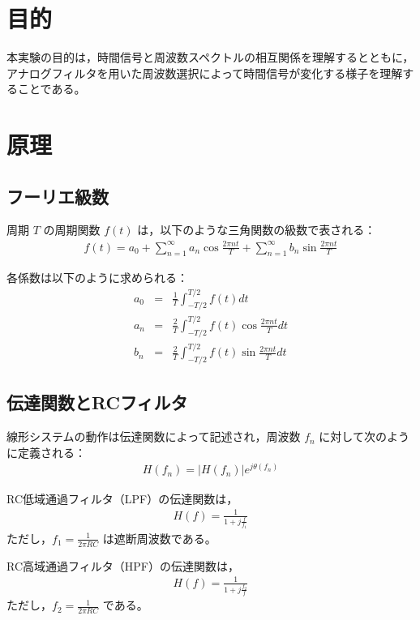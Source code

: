\documentclass[11pt,dvipdfmx]{jarticle}
\begin{document}


\section{目的}
本実験の目的は，時間信号と周波数スペクトルの相互関係を理解するとともに，アナログフィルタを用いた周波数選択によって時間信号が変化する様子を理解することである。

\section{原理}

\subsection{フーリエ級数}
周期 $T$ の周期関数 $f(t)$ は，以下のような三角関数の級数で表される：
\begin{eqnarray}
f(t) = a_0 + \sum_{n=1}^{\infty} a_n \cos \frac{2\pi nt}{T} + \sum_{n=1}^{\infty} b_n \sin \frac{2\pi nt}{T}
\end{eqnarray}

各係数は以下のように求められる：
\begin{eqnarray}
a_0 &=& \frac{1}{T} \int_{-T/2}^{T/2} f(t) dt \\
a_n &=& \frac{2}{T} \int_{-T/2}^{T/2} f(t) \cos \frac{2\pi nt}{T} dt \\
b_n &=& \frac{2}{T} \int_{-T/2}^{T/2} f(t) \sin \frac{2\pi nt}{T} dt
\end{eqnarray}

\subsection{伝達関数とRCフィルタ}
線形システムの動作は伝達関数によって記述され，周波数 $f_n$ に対して次のように定義される：
\begin{eqnarray}
H(f_n) = |H(f_n)| e^{j\theta(f_n)}
\end{eqnarray}

RC低域通過フィルタ（LPF）の伝達関数は，
\begin{eqnarray}
H(f) = \frac{1}{1 + j\frac{f}{f_1}}
\end{eqnarray}
ただし，$f_1 = \frac{1}{2\pi RC}$ は遮断周波数である。

RC高域通過フィルタ（HPF）の伝達関数は，
\begin{eqnarray}
H(f) = \frac{1}{1 + j\frac{f_2}{f}}
\end{eqnarray}
ただし，$f_2 = \frac{1}{2\pi RC}$ である。
\end{document}
